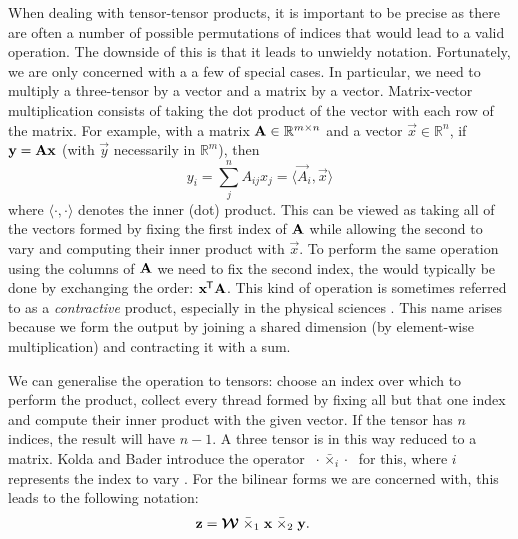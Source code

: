 When dealing with tensor-tensor products, it is important to be precise as there are often
a number of possible permutations of indices that would lead to a valid operation. The downside of
this is that it leads to unwieldy notation. Fortunately, we are only concerned with a a few of
special cases. In particular, we need to multiply a three-tensor by a vector and a matrix by a
vector. Matrix-vector multiplication consists of taking the dot product of the vector with
each row of the matrix. For example, with a matrix \(\mathbf{A} \in \mathbb{R}^{m \times n}\) and a
vector \(\vec{x} \in \mathbb{R}^n\), if \(\mathbf{y} = \mathbf{A}\mathbf{x}\) (with \(\vec{y}\) necessarily
in \(\mathbb{R}^m\)), then
\begin{equation}\label{eq:matmul}
	y_i = \sum_j^n A_{ij} x_j
		= \langle \vec{A}_i, \vec{x}\rangle
\end{equation} where \(\langle \cdot, \cdot \rangle\) denotes the inner (dot) product. This can be viewed
as taking all of the vectors formed by fixing the first index of \(\mathbf{A}\) while allowing the second
to vary and computing their inner product with \(\vec{x}\). To perform the same operation using the
columns of \(\mathbf{A}\) we need to fix the second index, the would typically be done by exchanging the
order: \(\mathbf{x}^{\mkern-1.5mu\mathsf{T}}\mathbf{A}\). This kind of operation is sometimes referred to as a
\emph{contractive} product, especially in the physical sciences \autocite{Orus2014}. This name
arises because we form the output by joining a shared dimension (by element-wise multiplication) and
contracting it with a sum.

We can generalise the operation to tensors: choose an index over which to perform the product,
collect every thread formed by fixing all but that one index and compute their inner product with the
given vector. If the tensor has \(n\) indices, the result will have \(n-1\). A three tensor is in
this way reduced to a matrix. Kolda and Bader introduce the operator
 \(\;\cdot \bar{\times}_i \cdot\;\)
for this, where \(i\) represents the index to vary \autocite{Kolda2009}. For the bilinear forms
we are concerned with, this leads to the following notation:
\begin{align}
	\mathbf{z} &= \bm{\mathcal{W}} \;\bar{\times}_1\; \mathbf{x}\; \bar{\times}_2\; \mathbf{y} .
	\label{eq:bilinearkolda}
\end{align}

